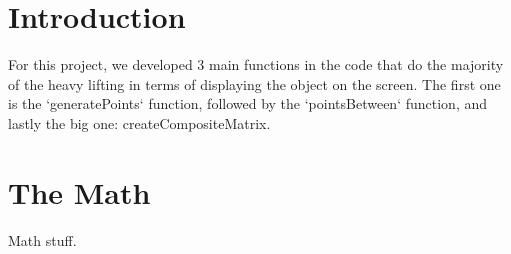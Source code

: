 \documentclass[14pt]{article}
\begin{document}
\newpage

\section*{Introduction}

For this project, we developed 3 main functions in the code that do the majority of the heavy lifting in terms of displaying the object on the screen. The first one is the `generatePoints` function, followed by the `pointsBetween` function, and lastly the big one: createCompositeMatrix.

\section*{The Math}

Math stuff.
\end{document}
